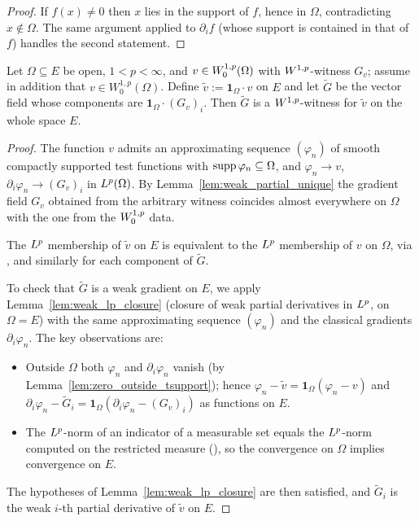 \begin{proof}
\leanok

If $f(x) \ne 0$ then $x$ lies in the support of $f$, hence in $\Omega$,
contradicting $x \notin \Omega$. The same argument applied to $\partial_i f$
(whose support is contained in that of $f$) handles the second statement.
\end{proof}

\begin{theorem}
\label{thm:zero_extend}
\leanok
{}
Let $\Omega \subseteq E$ be open, $1 < p < \infty$, and $v \in W_0^{1,p}(\Omega)$
with $W^{1,p}$-witness $G_v$; assume in addition that $v \in W_0^{1,p}(\Omega)$. Define $\tilde v := \mathbf{1}_\Omega \cdot v$
on $E$ and let $\tilde G$ be the vector field whose components are
$\mathbf{1}_\Omega \cdot (G_v)_i$. Then $\tilde G$ is a $W^{1,p}$-witness
for $\tilde v$ on the whole space $E$.
\end{theorem}

\begin{proof}
\leanok
{}

The function $v$ admits an approximating sequence $(\varphi_n)$ of smooth
compactly supported test functions with $\operatorname{supp}\varphi_n \subseteq \Omega$, and
$\varphi_n \to v$, $\partial_i\varphi_n \to (G_v)_i$ in $L^{p}(\Omega)$. By
Lemma~\ref{lem:weak_partial_unique} the gradient field $G_v$ obtained from the
arbitrary witness coincides almost everywhere on $\Omega$ with the one from the
$W_0^{1,p}$ data.

The $L^{p}$ membership of $\tilde v$ on $E$ is equivalent to the $L^{p}$
membership of $v$ on $\Omega$, via
, and similarly for each
component of $\tilde G$.

To check that $\tilde G$ is a weak gradient on $E$, we apply
Lemma~\ref{lem:weak_lp_closure} (closure of weak partial derivatives in
$L^{p}$, on $\Omega = E$) with the same approximating sequence
$(\varphi_n)$ and the classical gradients $\partial_i\varphi_n$. The
key observations are:
\begin{itemize}
  \item Outside $\Omega$ both $\varphi_n$ and $\partial_i\varphi_n$ vanish (by
        Lemma~\ref{lem:zero_outside_tsupport}); hence
        $\varphi_n - \tilde v = \mathbf{1}_\Omega(\varphi_n - v)$ and
        $\partial_i\varphi_n - \tilde G_i =
         \mathbf{1}_\Omega(\partial_i\varphi_n - (G_v)_i)$ as functions on $E$.
  \item The $L^{p}$-norm of an indicator of a measurable set equals the
        $L^{p}$-norm computed on the restricted measure
        (),
        so the convergence on $\Omega$ implies convergence on $E$.
\end{itemize}
The hypotheses of Lemma~\ref{lem:weak_lp_closure} are then satisfied, and
$\tilde G_i$ is the weak $i$-th partial derivative of $\tilde v$ on $E$.
\end{proof}

